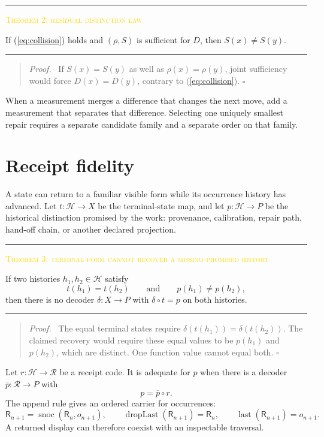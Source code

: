\documentclass[11pt]{article}
\newcommand{\smallcaps}[1]{{\footnotesize\textsc{#1}}}
\newcommand{\eqrefn}[1]{(\ref{#1})}
\DeclareMathOperator{\snoc}{snoc}
\newenvironment{claimbox}[1]{%
  \par\vspace{0.55em}\noindent\begin{minipage}{\linewidth}
  \color{line}\rule{\linewidth}{0.55pt}\par\vspace{0.34em}%
  \textcolor{gold}{\smallcaps{#1}}\par\vspace{0.3em}\color{ink}%
}{%
  \par\vspace{0.38em}\color{line}\rule{\linewidth}{0.55pt}%
  \end{minipage}\par\vspace{0.55em}%
}
\newenvironment{proofbox}{%
  \begin{quote}\small\color{deep}\textit{Proof.}\ }{\hfill$\square$\end{quote}}
\begin{document}
\begin{claimbox}{Theorem 2: residual distinction law}
If \eqrefn{eq:collision} holds and $(\rho,S)$ is sufficient for $D$, then $S(x)\ne S(y)$.
\end{claimbox}

\begin{proofbox}
If $S(x)=S(y)$ as well as $\rho(x)=\rho(y)$, joint sufficiency would force $D(x)=D(y)$, contrary to \eqrefn{eq:collision}.
\end{proofbox}

When a measurement merges a difference that changes the next move, add a measurement that separates that difference. Selecting one uniquely smallest repair requires a separate candidate family and a separate order on that family.

\section{Receipt fidelity}

A state can return to a familiar visible form while its occurrence history has advanced. Let $t:\mathcal H\to X$ be the terminal-state map, and let $p:\mathcal H\to P$ be the historical distinction promised by the work: provenance, calibration, repair path, hand-off chain, or another declared projection.

\begin{claimbox}{Theorem 3: terminal form cannot recover a missing promised history}
If two histories $h_1,h_2\in\mathcal H$ satisfy
\[
t(h_1)=t(h_2)\qquad\text{and}\qquad p(h_1)\ne p(h_2),
\tag{10}\label{eq:receiptcollision}
\]
then there is no decoder $\delta:X\to P$ with $\delta\circ t=p$ on both histories.
\end{claimbox}

\begin{proofbox}
The equal terminal states require $\delta(t(h_1))=\delta(t(h_2))$. The claimed recovery would require these equal values to be $p(h_1)$ and $p(h_2)$, which are distinct. One function value cannot equal both.
\end{proofbox}

Let $r:\mathcal H\to\mathcal R$ be a receipt code. It is adequate for $p$ when there is a decoder $\overline p:\mathcal R\to P$ with
\[
p=\overline p\circ r.
\tag{11}\label{eq:receipt}
\]
The append rule gives an ordered carrier for occurrences:
\[
\mathsf R_{n+1}=\snoc(\mathsf R_n,o_{n+1}),\qquad
\operatorname{dropLast}(\mathsf R_{n+1})=\mathsf R_n,\qquad
\operatorname{last}(\mathsf R_{n+1})=o_{n+1}.
\tag{12}\label{eq:ledger}
\]
A returned display can therefore coexist with an inspectable traversal.
\end{document}
